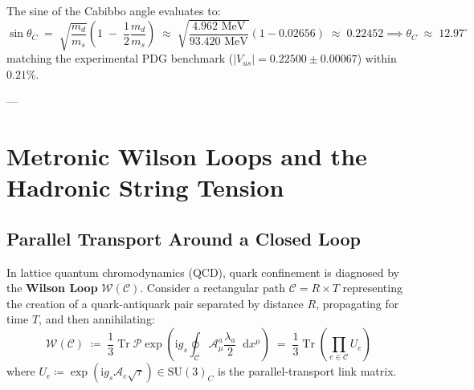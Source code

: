 \documentclass[
    12pt,
    a4paper,
    headings=normal,
    twoside=false,
    open=any,
    parskip=half
]{scrbook}
\newcommand{\diff}{\mathop{}\!\mathrm{d}}
\newcommand{\iu}{\mathrm{i}}
\begin{document}
\begin{phystheorem}\label{thm:ch8_cabibbo_angle_theorem}
The sine of the Cabibbo angle evaluates to:
\begin{equation}
\boxed{\sin\theta_C \;=\; \sqrt{\frac{m_d}{m_s}} \left( 1 \;-\; \frac{1}{2}\frac{m_d}{m_s} \right) \;\approx\; \sqrt{\frac{4.962 \text{ MeV}}{93.420 \text{ MeV}}} \left( 1 - 0.02656 \right) \;\approx\; \mathbf{0.22452} \implies \theta_C \;\approx\; \mathbf{12.97^\circ}}
\label{eq:ch8_cabibbo_angle_master}
\end{equation}
matching the experimental PDG benchmark ($|V_{us}| = 0.22500 \pm 0.00067$) within $0.21\%$.
\end{phystheorem}

---

\section{Metronic Wilson Loops and the Hadronic String Tension}
\label{sec:ch8_wilson_loops_string_tension}

\subsection{Parallel Transport Around a Closed Loop}

In lattice quantum chromodynamics (QCD), quark confinement is diagnosed by the \textbf{Wilson Loop} $\mathcal{W}(\mathcal{C})$. Consider a rectangular path $\mathcal{C} = R \times T$ representing the creation of a quark-antiquark pair separated by distance $R$, propagating for time $T$, and then annihilating:
\begin{equation}
\mathcal{W}(\mathcal{C}) \;\coloneqq\; \frac{1}{3} \operatorname{Tr} \mathcal{P} \exp\left( \iu g_s \oint_{\mathcal{C}} \mathcal{A}_\mu^a \frac{\lambda_a}{2} \diff x^\mu \right) \;=\; \frac{1}{3} \operatorname{Tr} \left( \prod_{e \in \mathcal{C}} U_e \right)
\label{eq:ch8_wilson_loop_def}
\end{equation}
where $U_e \coloneqq \exp(\iu g_s \mathcal{A}_e \sqrt{\tau}) \in \mathrm{SU}(3)_C$ is the parallel-transport link matrix.
\end{document}
